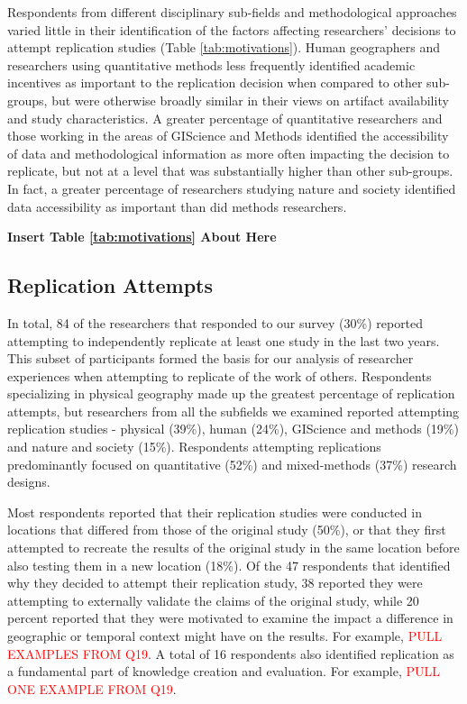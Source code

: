 \documentclass[]{interact}
\theoremstyle{plain}%
\theoremstyle{definition}
\theoremstyle{remark}
\begin{document}
Respondents from different disciplinary sub-fields and methodological approaches varied little in their identification of the factors affecting researchers' decisions to attempt replication studies (Table \ref{tab:motivations}). 
Human geographers and researchers using quantitative methods less frequently identified academic incentives as important to the replication decision when compared to other sub-groups, but were otherwise broadly similar in their views on artifact availability and study characteristics. 
A greater percentage of quantitative researchers and those working in the areas of GIScience and Methods identified the accessibility of data and methodological information as more often impacting the decision to replicate, but not at a level that was substantially higher than other sub-groups. 
In fact, a greater percentage of researchers studying nature and society identified data accessibility as important than did methods researchers.  

\begin{center}
\textbf{Insert Table \ref{tab:motivations} About Here}
\end{center}

\subsection*{Replication Attempts}
In total, 84 of the researchers that responded to our survey (30\%) reported attempting to independently replicate at least one study in the last two years.   
This subset of participants formed the basis for our analysis of researcher experiences when attempting to replicate of the work of others.
Respondents specializing in physical geography made up the greatest percentage of replication attempts, but researchers from all the subfields we examined reported attempting replication studies - physical (39\%), human (24\%), GIScience and methods (19\%) and nature and society (15\%).  
Respondents attempting replications predominantly focused on quantitative (52\%) and mixed-methods (37\%) research designs. 

Most respondents reported that their replication studies were conducted in locations that differed from those of the original study (50\%), or that they first attempted to recreate the results of the original study in the same location before also testing them in a new location (18\%). 
Of the 47 respondents that identified why they decided to attempt their replication study, 38 reported they were attempting to externally validate the claims of the original study, while 20 percent reported that they were motivated to examine the impact a difference in geographic or temporal context might have on the results. 
For example, \textcolor{red}{PULL EXAMPLES FROM Q19}.
A total of 16 respondents also identified replication as a fundamental part of knowledge creation and evaluation. 
For example, \textcolor{red}{PULL ONE EXAMPLE FROM Q19}.
\end{document}
